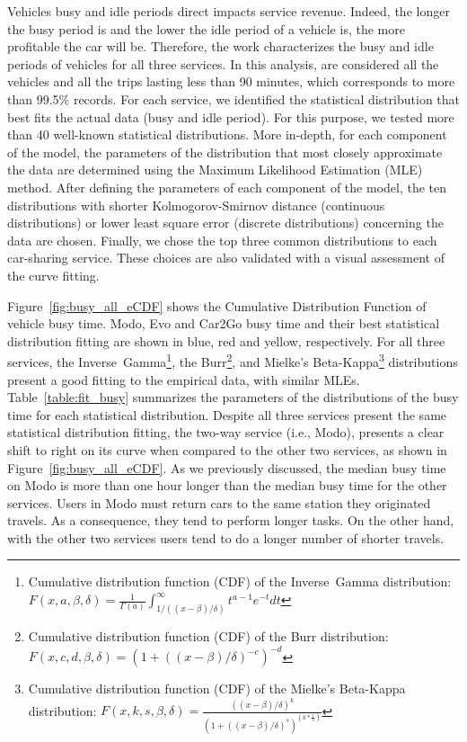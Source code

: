 Vehicles busy and idle periods direct impacts service revenue. Indeed, the longer the busy period is and the lower the idle period of a vehicle is, the more profitable the car will be. Therefore, the work characterizes the busy and idle periods of vehicles for all three services. In this analysis, are considered all the vehicles and all the trips lasting less than 90 minutes, which corresponds to more than 99.5\% records. 
For each service, we identified the statistical distribution that best fits the actual data (busy and idle period). For this purpose, we tested more than 40 well-known statistical distributions. More in-depth, for each component of the model, the parameters of the distribution that most closely approximate the data are determined using the Maximum Likelihood Estimation (MLE) method. After defining the parameters of each component of the model, the ten distributions with shorter Kolmogorov-Smirnov distance (continuous distributions) or lower least square error (discrete distributions) concerning the data are chosen. Finally, we chose the top three common distributions to each car-sharing service. These choices are also validated with a visual assessment of the curve fitting.

Figure~\ref{fig:busy_all_eCDF} shows the Cumulative Distribution Function of vehicle busy time.  Modo, Evo and Car2Go busy time and their best statistical distribution fitting are shown in blue, red and yellow, respectively. For all three services, the Inverse~Gamma\footnote{Cumulative distribution function (CDF) of the Inverse~Gamma distribution: $F(x, a, \beta, \delta) = \frac{1}{\Gamma(a)}\int_{1/\left((x-\beta)/\delta\right)}^{\infty}t^{a-1}e^{-t}dt$}, 
the Burr\footnote{Cumulative distribution function (CDF) of the Burr distribution: $F(x,c,d,\beta,\delta)=\left(1 + \left((x-\beta)/\delta\right)^{-c}\right)^{-d}$}, 
and Mielke's Beta-Kappa\footnote{Cumulative distribution function (CDF) of the Mielke's Beta-Kappa distribution: $F(x,k,s,\beta,\delta) = \frac{\left((x-\beta)/\delta\right)^{k}}{(1+\left((x-\beta)/\delta\right)^{s})^{(k*\frac{1}{s})}}$} 
distributions present a  good fitting to the empirical data, with similar MLEs.  
Table~\ref{table:fit_busy} summarizes the parameters of the distributions of the busy time for each statistical distribution.
Despite all three services present the same statistical distribution fitting, 
the two-way service (i.e., Modo), presents a clear shift to right on its curve when compared to the other two services, as shown in Figure~\ref{fig:busy_all_eCDF}. As we previously discussed, the median busy time on Modo is more than one hour longer than the median busy time for the other services. 
Users in Modo must return cars to the same station they originated travels. As a consequence, they tend to perform longer tasks. On the other hand, with the other two services users tend to do a longer number of shorter travels.

